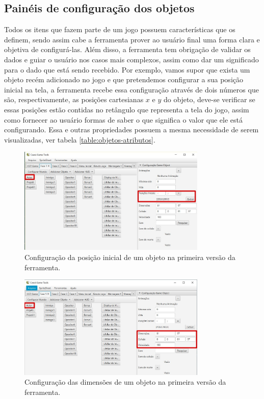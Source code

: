 \documentclass[12pt,twoside,openright,a4paper,english,brazil,sumario=tradicional]{abntex2}
\begin{document}
\subsection{Painéis de configuração dos objetos}
\label{sec:paineis-objetos}
Todos os itens que fazem parte de um jogo possuem características que os definem, sendo assim cabe a ferramenta prover ao usuário final uma forma clara e objetiva de configurá-las. Além disso, a ferramenta tem obrigação de validar os dados e guiar o usuário nos casos mais complexos, assim como dar um significado para o dado que está sendo recebido. Por exemplo, vamos supor que exista um objeto recém adicionado no jogo e que pretendemos configurar a sua posição inicial na tela, a ferramenta recebe essa configuração através de dois números que são, respectivamente, as posições cartesianas $x$ e $y$ do objeto, deve-se verificar se essas posições estão contidas no retângulo que representa a tela do jogo, assim como fornecer ao usuário formas de saber o que significa o valor que ele está configurando. Essa e outras propriedades possuem a mesma necessidade de serem visualizadas, ver tabela \ref{table:objetos-atributos}.

\begin{figure}[h]
\centering
\includegraphics[width=0.8\textwidth]{images/pos_inicial.jpg}
\caption{Configuração da posição inicial de um objeto na primeira versão da ferramenta.}
\label{fig:obj_pos_inicial}
\end{figure}

\begin{figure}[h]
\centering
\includegraphics[width=0.8\textwidth]{images/obj_dimensoes.jpg}
\caption{Configuração das dimensões de um objeto na primeira versão da ferramenta.}
\label{fig:obj_dimensoes}
\end{figure}
\end{document}
